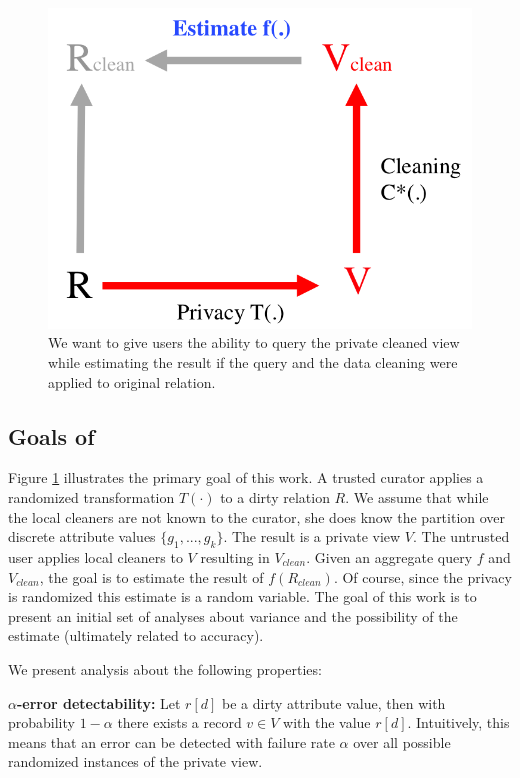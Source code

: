 \begin{figure}[t]
\centering
 \includegraphics[width=0.6\columnwidth]{figs/example2.png}
 \caption{We want to give users the ability to query the private cleaned view while estimating the result if the query and the data cleaning were applied to original relation. \label{example2}}
\end{figure}

\subsection{Goals of \sys}
Figure \ref{example2} illustrates the primary goal of this work.
A trusted curator applies a randomized transformation $T(\cdot)$ to a dirty relation $R$.
We assume that while the local cleaners are not known to the curator, she does know the partition over discrete attribute values $\{g_1,...,g_k\}$.
The result is a private view $V$.
The untrusted user applies local cleaners to $V$ resulting in $V_{clean}$.
Given an aggregate query $f$ and $V_{clean}$, the goal is to estimate the result of $f(R_{clean})$.
Of course, since the privacy is randomized this estimate is a random variable.
The goal of this work is to present an initial set of analyses about variance and the possibility of the estimate (ultimately related to accuracy).

\noindent We present analysis about the following properties:

\vspace{0.5em}

\noindent\textbf{$\alpha$-error detectability: } Let $r[d]$ be a dirty attribute value, then with probability $1-\alpha$ there exists a record $v \in V$ with the value $r[d]$. Intuitively, this means that an error can be detected with failure rate $\alpha$ over all possible randomized instances of the private view.

\vspace{0.5em}


